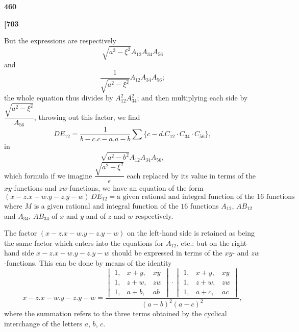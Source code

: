 \documentclass[12pt,a4paper]{article}
\theoremstyle{definition}
\begin{document}
\begin{center}
\textbf{460}
\end{center}

\vspace{0.5em}

\noindent\textbf{[703}

\vspace{0.5em}

But the expressions are respectively
\[
\sqrt{a^2 - \xi^2} A_{12} A_{34} A_{56}
\]
and
\[
\frac{1}{\sqrt{a^2 - \xi^2}} A_{12} A_{34} A_{56};
\]
the whole equation thus divides by $A_{12}^2 A_{34}^2$; and then multiplying each side by $\dfrac{\sqrt{a^2 - \xi^2}}{A_{56}}$, throwing out this factor, we find
\[
DE_{12} = \frac{1}{b - c . c - a . a - b} \sum\{c - d . C_{12} \cdot C_{34} \cdot C_{56}\},
\]
in
\[
\sqrt{a^2 - b^2} A_{12} A_{34} A_{56},
\]
which formula if we imagine $\dfrac{\sqrt{a^2 - \xi^2}}{\epsilon}$ each replaced by its value in terms of the $xy$-functions and $zw$-functions, we have an equation of the form
\[
(x - z . x - w . y - z . y - w)\, DE_{12} = \text{a given rational and integral function of the $16$ functions}
\]
where $M$ is a given rational and integral function of the $16$ functions $A_{12}$, $AB_{12}$ and $A_{34}$, $AB_{34}$ of $x$ and $y$ and of $z$ and $w$ respectively.

The factor $(x - z . x - w . y - z . y - w)$ on the left-hand side is retained as being the same factor which enters into the equations for $A_{12}$, etc.: but on the right-hand side $x - z . x - w . y - z . y - w$ should be expressed in terms of the $xy$- and $zw$-functions. This can be done by means of the identity
\[
x - z . x - w . y - z . y - w = \frac{\begin{vmatrix} 1, & x + y, & xy \\ 1, & z + w, & zw \\ 1, & a + b, & ab \end{vmatrix} \cdot \begin{vmatrix} 1, & x + y, & xy \\ 1, & z + w, & zw \\ 1, & a + c, & ac \end{vmatrix}}{(a - b)^2 (a - c)^2},
\]
where the summation refers to the three terms obtained by the cyclical interchange of the letters $a$, $b$, $c$.
\end{document}
